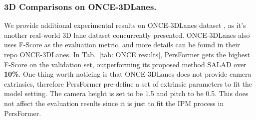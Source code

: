 \documentclass[runningheads]{llncs}
\begin{document}
\subsubsection{3D Comparisons on ONCE-3DLanes.}
We provide additional experimental results on ONCE-3DLanes dataset \cite{yan2022once3dlane}, as it's another real-world 3D lane dataset concurrently presented.
ONCE-3DLanes also uses F-Score as the evaluation metric, and more details can be found in their repo \href{https://github.com/once-3dlanes/once_3dlanes_benchmark}{ONCE-3DLanes}.
In Tab.~\ref{tab: ONCE results}, PersFormer gets the highest F-Score on the validation set, outperforming its proposed method SALAD \cite{yan2022once3dlane} over \textbf{10\%}.
One thing worth noticing is that ONCE-3DLanes does not provide camera extrinsics, therefore PersFormer pre-define a set of extrinsic parameters to fit the model setting.
The camera height is set to be 1.5 and pitch to be 0.5.
This does not affect the evaluation results since it is just to fit the IPM process in PersFormer.

\begin{table*}[t!]
\caption{New results on the new benchmark (CVPR22) ONCE-3DLanes~\cite{yan2022once3dlane}.  denotes results from the paper~\cite{yan2022once3dlane}}
\centering
\label{tab: ONCE results}
\end{table*}
\end{document}

